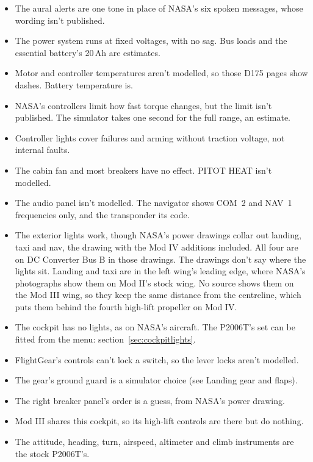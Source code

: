 \documentclass[11pt,a4paper,oneside]{book}
\newcommand{\ann}[1]{\textsf{\small #1}}
\begin{document}
\begin{itemize}
\item The aural alerts are one tone in place of NASA's six spoken messages, whose wording isn't published.
\item The power system runs at fixed voltages, with no sag. Bus loads and the essential battery's 20\,Ah are estimates.
\item Motor and controller temperatures aren't modelled, so those D175 pages show dashes. Battery temperature is.
\item NASA's controllers limit how fast torque changes, but the limit isn't published. The simulator takes one second for the full range, an estimate.
\item Controller lights cover failures and arming without traction voltage, not internal faults.
\item The cabin fan and most breakers have no effect. \ann{PITOT HEAT} isn't modelled.
\item The audio panel isn't modelled. The navigator shows COM~2 and NAV~1 frequencies only, and the transponder its code.
\item The exterior lights work, though NASA's power drawings collar out landing, taxi and nav, the drawing with the Mod IV additions included. All four are on DC Converter Bus B in those drawings. The drawings don't say where the lights sit. Landing and taxi are in the left wing's leading edge, where NASA's photographs show them on Mod II's stock wing. No source shows them on the Mod III wing, so they keep the same distance from the centreline, which puts them behind the fourth high-lift propeller on Mod IV.
\item The cockpit has no lights, as on NASA's aircraft. The P2006T's set can be fitted from the menu: section~\ref{sec:cockpitlights}.
\item FlightGear's controls can't lock a switch, so the lever locks aren't modelled.
\item The gear's ground guard is a simulator choice (see Landing gear and flaps).
\item The right breaker panel's order is a guess, from NASA's power drawing.
\item Mod III shares this cockpit, so its high-lift controls are there but do nothing.
\item The attitude, heading, turn, airspeed, altimeter and climb instruments are the stock P2006T's.
\end{itemize}
\end{document}
